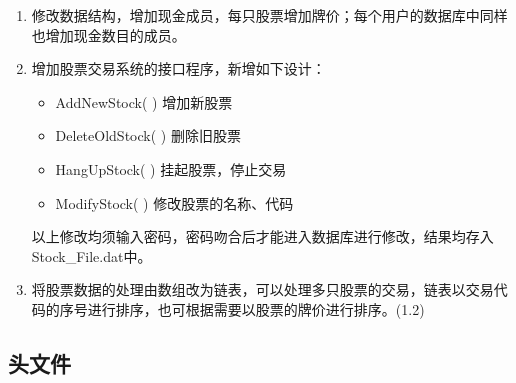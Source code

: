 \begin{enumerate}[label={（\arabic*）}]
\item 修改数据结构，增加现金成员，每只股票增加牌价；每个用户的数据库中同样也增加现金数目的成员。 
\item 增加股票交易系统的接口程序，新增如下设计： 
\begin{itemize}[label={}]
\item AddNewStock( )   增加新股票
\item DeleteOldStock( )  删除旧股票
\item HangUpStock( )   挂起股票，停止交易
\item ModifyStock( )    修改股票的名称、代码
\end{itemize}
以上修改均须输入密码，密码吻合后才能进入数据库进行修改，结果均存入Stock\_File.dat中。
\item 将股票数据的处理由数组改为链表，可以处理多只股票的交易，链表以交易代码的序号进行排序，也可根据需要以股票的牌价进行排序。(1.2)
\end{enumerate}


\subsection{头文件}

\linespread{1}












